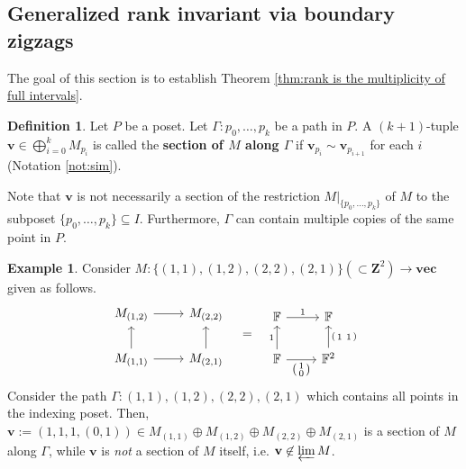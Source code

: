 \documentclass[11pt]{article}
\theoremstyle{definition}
\newtheorem{definition}[theorem]{Definition}
\newtheorem{example}[theorem]{Example}
\newcommand{\bv}{\mathbf{v}}
\newcommand{\vect}{\mathbf{vec}}
\newcommand{\F}{\mathbb{F}}
\newcommand{\Z}{\mathbf{Z}}
\begin{document}
\subsection{Generalized rank invariant via boundary zigzags}\label{sec: generalized rank via boundary}

The goal of this section is to establish Theorem \ref{thm:rank is the multiplicity of full intervals}.

\begin{definition}\label{def:section along a path} 
Let $P$ be a poset. Let $\Gamma:p_0,\ldots,p_k$ be a path in $P$. A $(k+1)$-tuple $\bv\in \bigoplus_{i=0}^k M_{p_i}$ is called the \textbf{section of $M$ along $\Gamma$} if $\bv_{p_i}\sim\bv_{p_{i+1}}$ for each $i$ (Notation \ref{not:sim}).
\end{definition} Note that $\bv$ is not necessarily a section of the restriction  $M|_{\{p_0,\ldots,p_k\}}$  of $M$ to the subposet $\{p_0,\ldots,p_k\}\subseteq I$. Furthermore, $\Gamma$ can contain multiple copies of the same point in $P$.



\begin{example}\label{ex:section along a path}
Consider $M:\{(1,1),(1,2),(2,2),(2,1)\}(\subset \Z^2)\rightarrow \vect$ given as follows.
 \[\begin{tikzcd}
M_{(1,2)} \arrow{r}{} 
&M_{(2,2)} \\
M_{(1,1)} \arrow{r}{} \arrow{u}{} &M_{(2,1)} \arrow{u}{}
\end{tikzcd}\hspace{3mm}=\hspace{3mm}\begin{tikzcd}
\F \arrow{r}{1} 
&\F \\
\F \arrow[swap]{r}{\left(\begin{smallmatrix}1\\0\end{smallmatrix}\right)} \arrow{u}{1} &\F^2 \arrow[swap]{u}{\left(\begin{smallmatrix}1 \ 1\end{smallmatrix}\right)}\end{tikzcd}
\]
Consider the path $\Gamma:(1,1),(1,2),(2,2),(2,1)$ which contains all points in the indexing poset. Then, $\bv:=(1,1,1,(0,1))\in M_{(1,1)}\oplus M_{(1,2)}\oplus M_{(2,2)}\oplus M_{(2,1)}$ is a section of $M$ along $\Gamma$, while $\bv$ is \emph{not} a section of $M$ itself, i.e. $\bv\not\in \varprojlim M$. 
\end{example}
\end{document}

